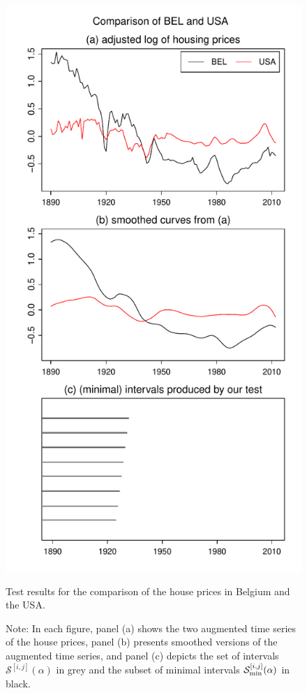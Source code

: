 \documentclass[12pt]{article}
\begin{document}
\begin{figure}
\hspace{0.1cm}
\begin{minipage}[t]{0.24\textwidth}
\includegraphics[width=\textwidth]{../output/plots/hp/BEL_vs_USA}
\caption{Test results for the comparison of the house prices in Belgium and the USA.}\label{fig:hp:Belgium:USA}
\end{minipage}
\caption*{Note: In each figure, panel (a) shows the two augmented time series of the house prices, panel (b) presents smoothed versions of the augmented time series, and panel (c) depicts the set of intervals $\mathcal{S}^{[i, j]}(\alpha)$ in grey and the subset of minimal intervals $\mathcal{S}^{[i, j]}_{\textnormal{min}}(\alpha)$ in black.}
\end{figure}
\end{document}
